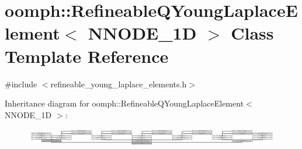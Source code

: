 \hypertarget{classoomph_1_1RefineableQYoungLaplaceElement}{}\section{oomph\+:\+:Refineable\+Q\+Young\+Laplace\+Element$<$ N\+N\+O\+D\+E\+\_\+1D $>$ Class Template Reference}
\label{classoomph_1_1RefineableQYoungLaplaceElement}


{\ttfamily \#include $<$refineable\+\_\+young\+\_\+laplace\+\_\+elements.\+h$>$}

Inheritance diagram for oomph\+:\+:Refineable\+Q\+Young\+Laplace\+Element$<$ N\+N\+O\+D\+E\+\_\+1D $>$\+:\begin{figure}[H]
\begin{center}
\leavevmode
\includegraphics[height=0.797721cm]{classoomph_1_1RefineableQYoungLaplaceElement}
\end{center}
\end{figure}
